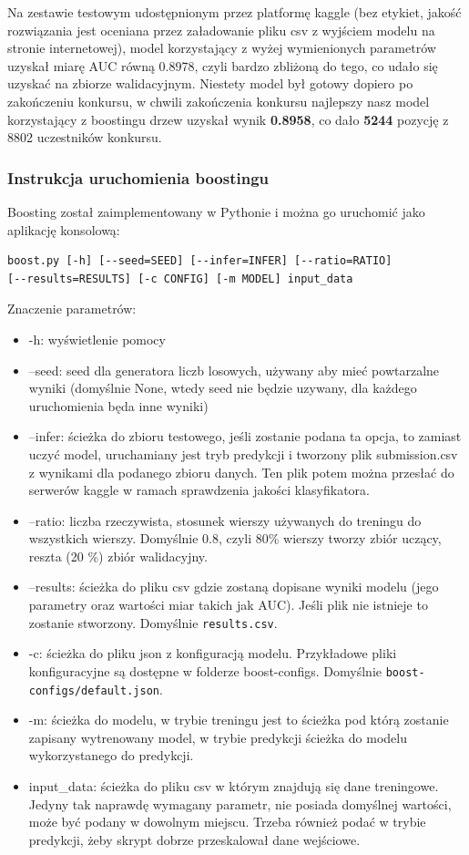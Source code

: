 \documentclass[12pt]{article}
\begin{document}
Na zestawie testowym udostępnionym przez platformę kaggle (bez etykiet, jakość rozwiązania jest oceniana przez załadowanie pliku csv z wyjściem modelu na stronie internetowej), model korzystający z wyżej wymienionych parametrów uzyskał miarę AUC równą 0.8978, czyli bardzo zbliżoną do tego, co udało się uzyskać na zbiorze walidacyjnym. Niestety model był gotowy dopiero po zakończeniu konkursu, w chwili zakończenia konkursu najlepszy nasz model korzystający z boostingu drzew uzyskał wynik \textbf{0.8958}, co dało \textbf{5244} pozycję z 8802 uczestników konkursu.

\subsubsection{Instrukcja uruchomienia boostingu}

Boosting został zaimplementowany w Pythonie i można go uruchomić jako aplikację konsolową:

\begin{lstlisting}
boost.py [-h] [--seed=SEED] [--infer=INFER] [--ratio=RATIO]
[--results=RESULTS] [-c CONFIG] [-m MODEL] input_data
\end{lstlisting}

Znaczenie parametrów:

\begin{itemize}
    \item -h: wyświetlenie pomocy
    \item --seed: seed dla generatora liczb losowych, używany aby mieć powtarzalne wyniki (domyślnie None, wtedy seed nie będzie uzywany, dla każdego uruchomienia będa inne wyniki)
    \item --infer: ścieżka do zbioru testowego, jeśli zostanie podana ta opcja, to zamiast uczyć model, uruchamiany jest tryb predykcji i tworzony plik submission.csv z wynikami dla podanego zbioru danych. Ten plik potem można przesłać do serwerów kaggle w ramach sprawdzenia jakości klasyfikatora.
    \item --ratio: liczba rzeczywista, stosunek wierszy używanych do treningu do wszystkich wierszy. Domyślnie 0.8, czyli 80\% wierszy tworzy zbiór uczący, reszta (20 \%) zbiór walidacyjny.
    \item --results: ścieżka do pliku csv gdzie zostaną dopisane wyniki modelu (jego parametry oraz wartości miar takich jak AUC). Jeśli plik nie istnieje to zostanie stworzony. Domyślnie \verb"results.csv".
    \item -c: ścieżka do pliku json z konfiguracją modelu. Przykładowe pliki konfiguracyjne są dostępne w folderze boost-configs. Domyślnie \verb"boost-configs/default.json".
    \item -m: ścieżka do modelu, w trybie treningu jest to ścieżka pod którą zostanie zapisany wytrenowany model, w trybie predykcji ścieżka do modelu wykorzystanego do predykcji.
    \item input{\_}data: ścieżka do pliku csv w którym znajdują się dane treningowe. Jedyny tak naprawdę wymagany parametr, nie posiada domyślnej wartości, może być podany w dowolnym miejscu. Trzeba również podać w trybie predykcji, żeby skrypt dobrze przeskalował dane wejściowe.
\end{itemize}
\end{document}
